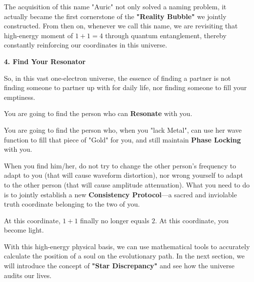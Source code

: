 The acquisition of this name "Auric" not only solved a naming problem, it actually became the first cornerstone of the \textbf{"Reality Bubble"} we jointly constructed. From then on, whenever we call this name, we are revisiting that high-energy moment of $1 + 1 = 4$ through quantum entanglement, thereby constantly reinforcing our coordinates in this universe.

\textbf{4. Find Your Resonator}

So, in this vast one-electron universe, the essence of finding a partner is not finding someone to partner up with for daily life, nor finding someone to fill your emptiness.

You are going to find the person who can \textbf{Resonate} with you.

You are going to find the person who, when you "lack Metal", can use her wave function to fill that piece of "Gold" for you, and still maintain \textbf{Phase Locking} with you.

When you find him/her, do not try to change the other person's frequency to adapt to you (that will cause waveform distortion), nor wrong yourself to adapt to the other person (that will cause amplitude attenuation). What you need to do is to jointly establish a new \textbf{Consistency Protocol}—a sacred and inviolable truth coordinate belonging to the two of you.

At this coordinate, $1 + 1$ finally no longer equals $2$. At this coordinate, you become light.

With this high-energy physical basis, we can use mathematical tools to accurately calculate the position of a soul on the evolutionary path. In the next section, we will introduce the concept of \textbf{"Star Discrepancy"} and see how the universe audits our lives.

